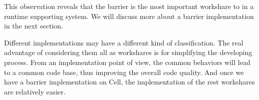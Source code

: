 This observation reveals that the barrier is the most important workshare to in
a runtime supporting system. We will discuss more about a barrier
implementation in the next section.

Different implementations may have a different kind of classification. The real
advantage of considering them all as workshares is for simplifying the
developing process. From an implementation point of view, the common behaviors
will lead to a common code base, thus improving the overall code quality. And
once we have a barrier implementation on Cell, the implementation of the rest
workshares are relatively easier.

